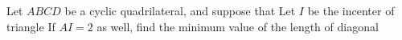 Let $ABCD$ be a cyclic quadrilateral, and suppose that  Let $I$ be the incenter of triangle  If $AI = 2$ as well, find the minimum value of the length of diagonal 